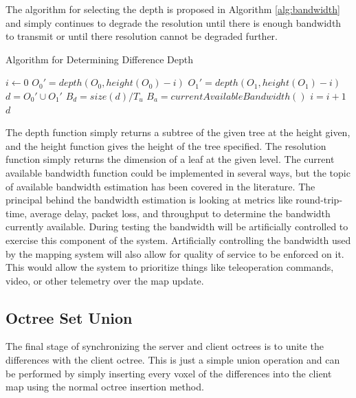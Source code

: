 \documentclass[12pt]{report}
\begin{document}
The algorithm for selecting the depth is proposed in Algorithm \ref{alg:bandwidth} and simply continues to degrade the resolution until there is enough bandwidth to transmit or until there resolution cannot be degraded further.

\begin{algorithm}
\caption{Algorithm for Determining Difference Depth}
\label{alg:bandwidth}
\begin{algorithmic}
  \STATE {}
  \STATE {}
  \STATE {}
  \STATE {}
  \STATE {}
  \STATE {}
  \STATE {}
  \STATE $i\gets 0$
  \REPEAT
    \STATE $O_0 \prime = depth(O_0,height(O_0)-i)$
    \STATE $O_1 \prime = depth(O_1,height(O_1)-i)$
    \STATE $d = O_0 \prime \cup O_1 \prime $
    \STATE $B_d = size(d) / T_u$
    \STATE $B_a = currentAvailableBandwidth()$
    \STATE $i = i + 1$
  \RETURN $d$
\end{algorithmic}
\end{algorithm}

The depth function simply returns a subtree of the given tree at the height given, and the height function gives the height of the tree specified.  The resolution function simply returns the dimension of a leaf at the given level.  The current available bandwidth function could be implemented in several ways, but the topic of available bandwidth estimation has been covered in the literature.\cite{prasad2003bandwidth} The principal behind the bandwidth estimation is looking at metrics like round-trip-time, average delay, packet loss, and throughput to determine the bandwidth currently available.  During testing the bandwidth will be artificially controlled to exercise this component of the system.  Artificially controlling the bandwidth used by the mapping system will also allow for quality of service to be enforced on it.  This would allow the system to prioritize things like teleoperation commands, video, or other telemetry over the map update.

\subsection{Octree Set Union}
The final stage of synchronizing the server and client octrees is to unite the differences with the client octree. This is just a simple union operation and can be performed by simply inserting every voxel of the differences into the client map using the normal octree insertion method.\cite{meagher1982geometric}
\end{document}
